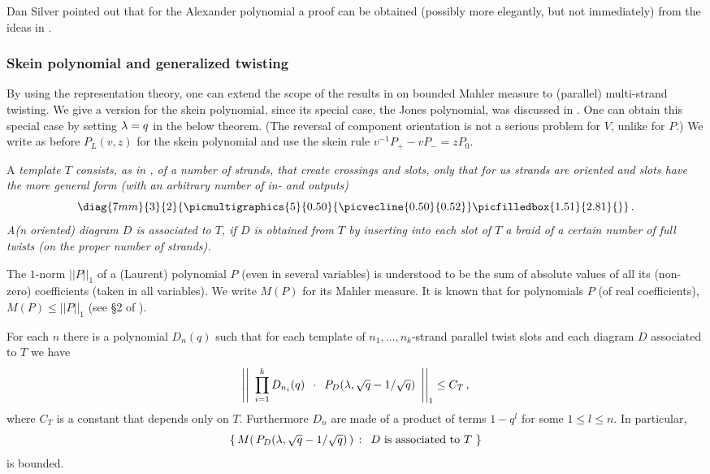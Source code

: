 \begin{rem}
Dan Silver pointed out that for the Alexander polynomial a proof
can be obtained (possibly more elegantly, but not immediately)
from the ideas in \cite{SW}.
\end{rem}

\subsubsection{Skein polynomial and generalized twisting}

By using the representation theory, one can extend the scope of
the results in \cite{SSW,CK} on bounded Mahler measure
to (parallel) multi-strand twisting.
We give a version for the skein polynomial, since its special case,
the Jones polynomial, was discussed in \cite{CK}. One can obtain
this special case by setting $\lambda=q$ in the below theorem. (The
reversal of component orientation is not a serious problem for
$V$, unlike for $P$.) We write as before $P_L(v,z)$ for the skein
polynomial and use the skein rule $v^{-1}P_+-vP_-=zP_0$.

A \em{template} $T$ consists, as in \cite{SunThis}, of a number of
strands, that create crossings and \em{slots}, only that for us
strands are oriented and slots have the more general form
(with an arbitrary number of in- and outputs)
\[
\diag{7mm}{3}{2}{
  \picmultigraphics{5}{0.5 0}{\picvecline{0.5 0}{0.5 2}}
  \picfilledbox{1.5 1}{2.8 1}{}
}\,.
\]
A(n oriented) diagram $D$ is \em{associated} to $T$, if $D$ is
obtained from $T$ by inserting into each slot of $T$ a braid of a
certain number of full twists (on the proper number of strands).

The $1$-norm $||P||_1$ of a (Laurent) polynomial $P$ (even in
several variables) is understood to be the sum of absolute values
of all its (non-zero) coefficients (taken in all variables).
We write $M(P)$ for its Mahler measure. It is known that for
polynomials $P$ (of real coefficients), $M(P)\le ||P||_1$
(see \S 2 of \cite{SSW}).

\begin{theorem}
For each $n$ there is a polynomial $D_n(q)$ such that for
each template of $n_1,\dots,n_k$-strand parallel twist
slots and each diagram $D$ associated to $T$ we have
\[
\left|\left|\enspace\prod_{i=1}^k D_{n_i}(q)\enspace\cdot\enspace
P_D(\lambda,\sqrt{q}-1/\sqrt{q})\enspace\right|\right|_1\le C_T\,,
\]
where $C_T$ is a constant that depends only on $T$.
Furthermore $D_n$ are made of a product of terms $1-q^{l}$
for some $1\le l\le n$. In particular, 
\[
\{\,M(\,P_D(\lm,\sqrt{q}-1/\sqrt{q})\,)\,:\,\mbox{\ $D$ is
associated to $T$\,}\,\}
\]
is bounded.
\end{theorem}

